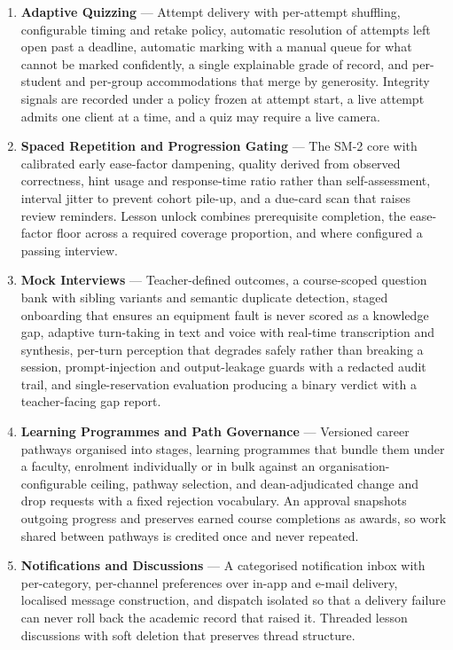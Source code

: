 \begin{enumerate}
    \item \textbf{Adaptive Quizzing} --- Attempt delivery with per-attempt shuffling, configurable timing and retake policy, automatic resolution of attempts left open past a deadline, automatic marking with a manual queue for what cannot be marked confidently, a single explainable grade of record, and per-student and per-group accommodations that merge by generosity. Integrity signals are recorded under a policy frozen at attempt start, a live attempt admits one client at a time, and a quiz may require a live camera.

    \item \textbf{Spaced Repetition and Progression Gating} --- The SM-2 core with calibrated early ease-factor dampening, quality derived from observed correctness, hint usage and response-time ratio rather than self-assessment, interval jitter to prevent cohort pile-up, and a due-card scan that raises review reminders. Lesson unlock combines prerequisite completion, the ease-factor floor across a required coverage proportion, and where configured a passing interview.

    \item \textbf{Mock Interviews} --- Teacher-defined outcomes, a course-scoped question bank with sibling variants and semantic duplicate detection, staged onboarding that ensures an equipment fault is never scored as a knowledge gap, adaptive turn-taking in text and voice with real-time transcription and synthesis, per-turn perception that degrades safely rather than breaking a session, prompt-injection and output-leakage guards with a redacted audit trail, and single-reservation evaluation producing a binary verdict with a teacher-facing gap report.

    \item \textbf{Learning Programmes and Path Governance} --- Versioned career pathways organised into stages, learning programmes that bundle them under a faculty, enrolment individually or in bulk against an organisation-configurable ceiling, pathway selection, and dean-adjudicated change and drop requests with a fixed rejection vocabulary. An approval snapshots outgoing progress and preserves earned course completions as awards, so work shared between pathways is credited once and never repeated.

    \item \textbf{Notifications and Discussions} --- A categorised notification inbox with per-category, per-channel preferences over in-app and e-mail delivery, localised message construction, and dispatch isolated so that a delivery failure can never roll back the academic record that raised it. Threaded lesson discussions with soft deletion that preserves thread structure.


\end{enumerate}
